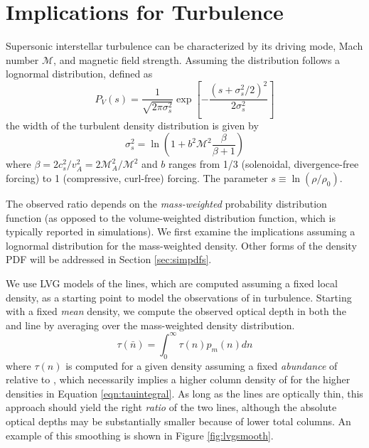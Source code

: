 \section{Implications for Turbulence}
Supersonic interstellar turbulence can be characterized by its driving mode,
Mach number $\mathcal{M}$, and magnetic field strength. 
Assuming the distribution follows a lognormal distribution, defined as
\begin{equation}
    \label{eqn:lognormal}
    P_V(s) = \frac{1}{\sqrt{2 \pi \sigma_s^2}} \exp\left[-\frac{(s+\sigma_s^2/2)^2}{2 \sigma_s^2}\right]
\end{equation}
the width of the turbulent density distribution
is given by
\begin{equation}
    \label{eqn:sigmas}
    \sigma_s^2 = \ln\left(1+b^2 \mathcal{M}^2 \frac{\beta}{\beta+1}\right)
\end{equation}
where $\beta= 2 c_s^2/v_A^2 = 2 \mathcal{M}_A^2/\mathcal{M}^2$ and $b$ ranges
from 1/3 (solenoidal, divergence-free forcing) to 1 (compressive, curl-free)
forcing.  The parameter $s\equiv\ln(\rho/\rho_0)$.


The observed \formaldehyde ratio depends on the \emph{mass-weighted}
probability distribution function (as opposed to the volume-weighted
distribution function, which is typically reported in simulations).  We first
examine the implications assuming a lognormal distribution for the
mass-weighted density.
Other forms of the density PDF will be addressed in Section \ref{sec:simpdfs}.

We use LVG models of the \formaldehyde lines, which are computed assuming a
fixed local density, as a starting point to model the observations of
\formaldehyde in turbulence.   Starting with a fixed \emph{mean} density, we
compute the observed \formaldehyde optical depth in both the \oneone and \twotwo
line by averaging over the mass-weighted density distribution.
\begin{equation}
    \label{eqn:tauintegral}
    \tau(\bar{n}) = \int_0^\infty \tau(n) p_m(n) dn
\end{equation}
where $\tau(n)$ is computed for a given density assuming a fixed
\emph{abundance} of \ortho relative to \hh, which necessarily implies a higher
column density of \ortho for the higher densities in Equation
\ref{eqn:tauintegral}.  As long as the \formaldehyde lines are optically thin,
this approach should yield the right \emph{ratio} of the two lines, although the
absolute optical depths may be substantially smaller because of lower total
\ortho columns.  An example of this smoothing is shown in Figure
\ref{fig:lvgsmooth}.

